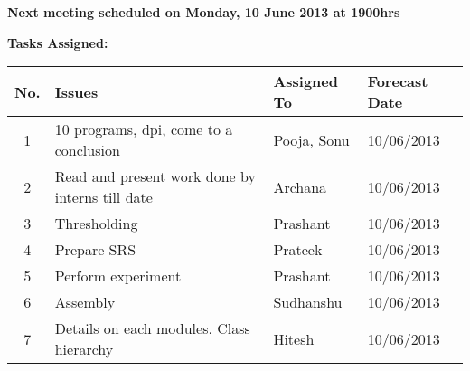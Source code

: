 \documentclass[a4paper,12pt]{article}
\begin{document}
\pagebreak

\vskip20pt
\textbf{Next meeting scheduled on Monday, 10 June 2013 at 1900hrs}

\vskip20pt
\textbf{Tasks Assigned:}
\vskip10pt
\begin{tabular}{|c|p{6cm}|p{3cm}|p{4cm}|}
 \hline
 \hline
 \textbf{No.} & \textbf{Issues} & \textbf{Assigned To} & \textbf{Forecast Date} \\
  \hline
  \hline
1 & 10 programs, dpi, come to a conclusion & Pooja, Sonu & 10/06/2013 \\
  \hline
2 & Read and present work done by interns till date & Archana & 10/06/2013 \\
  \hline
3 & Thresholding & Prashant & 10/06/2013 \\
  \hline
4 & Prepare SRS & Prateek & 10/06/2013 \\
  \hline
5 & Perform experiment & Prashant & 10/06/2013 \\
  \hline
6 & Assembly & Sudhanshu & 10/06/2013 \\
  \hline
7 & Details on each modules. Class hierarchy & Hitesh & 10/06/2013 \\
  \hline
\end{tabular}
\end{document}
